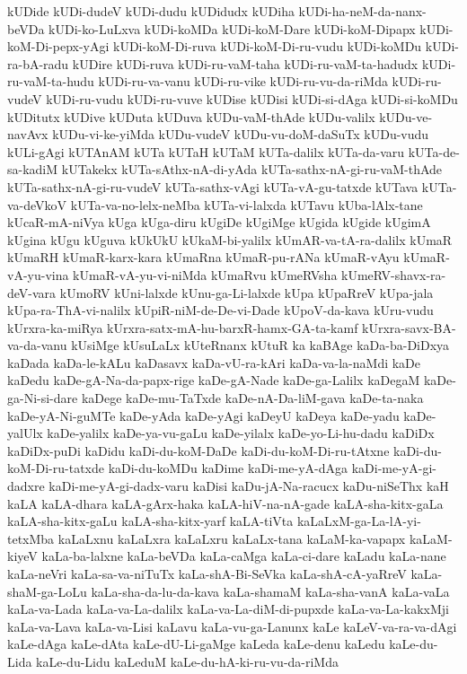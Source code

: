 {kUDide
kUDi-dudeV
kUDi-dudu
kUDidudx
kUDiha
kUDi-ha-neM-da-nanx-beVDa
kUDi-ko-LuLxva
kUDi-koMDa
kUDi-koM-Dare
kUDi-koM-Dipapx
kUDi-koM-Di-pepx-yAgi
kUDi-koM-Di-ruva
kUDi-koM-Di-ru-vudu
kUDi-koMDu
kUDi-ra-bA-radu
kUDire
kUDi-ruva
kUDi-ru-vaM-taha
kUDi-ru-vaM-ta-hadudx
kUDi-ru-vaM-ta-hudu
kUDi-ru-va-vanu
kUDi-ru-vike
kUDi-ru-vu-da-riMda
kUDi-ru-vudeV
kUDi-ru-vudu
kUDi-ru-vuve
kUDise
kUDisi
kUDi-si-dAga
kUDi-si-koMDu
kUDitutx
kUDive
kUDuta
kUDuva
kUDu-vaM-thAde
kUDu-valilx
kUDu-ve-navAvx
kUDu-vi-ke-yiMda
kUDu-vudeV
kUDu-vu-doM-daSuTx
kUDu-vudu
kULi-gAgi
kUTAnAM
kUTa
kUTaH
kUTaM
kUTa-dalilx
kUTa-da-varu
kUTa-de-sa-kadiM
kUTakekx
kUTa-sAthx-nA-di-yAda
kUTa-sathx-nA-gi-ru-vaM-thAde
kUTa-sathx-nA-gi-ru-vudeV
kUTa-sathx-vAgi
kUTa-vA-gu-tatxde
kUTava
kUTa-va-deVkoV
kUTa-va-no-lelx-neMba
kUTa-vi-lalxda
kUTavu
kUba-lAlx-tane
kUcaR-mA-niVya
kUga
kUga-diru
kUgiDe
kUgiMge
kUgida
kUgide
kUgimA
kUgina
kUgu
kUguva
kUkUkU
kUkaM-bi-yalilx
kUmAR-va-tA-ra-dalilx
kUmaR
kUmaRH
kUmaR-karx-kara
kUmaRna
kUmaR-pu-rANa
kUmaR-vAyu
kUmaR-vA-yu-vina
kUmaR-vA-yu-vi-niMda
kUmaRvu
kUmeRVsha
kUmeRV-shavx-ra-deV-vara
kUmoRV
kUni-lalxde
kUnu-ga-Li-lalxde
kUpa
kUpaRreV
kUpa-jala
kUpa-ra-ThA-vi-nalilx
kUpiR-niM-de-De-vi-Dade
kUpoV-da-kava
kUru-vudu
kUrxra-ka-miRya
kUrxra-satx-mA-hu-barxR-hamx-GA-ta-kamf
kUrxra-savx-BA-va-da-vanu
kUsiMge
kUsuLaLx
kUteRnanx
kUtuR
ka
kaBAge
kaDa-ba-DiDxya
kaDada
kaDa-le-kALu
kaDasavx
kaDa-vU-ra-kAri
kaDa-va-la-naMdi
kaDe
kaDedu
kaDe-gA-Na-da-papx-rige
kaDe-gA-Nade
kaDe-ga-Lalilx
kaDegaM
kaDe-ga-Ni-si-dare
kaDege
kaDe-mu-TaTxde
kaDe-nA-Da-liM-gava
kaDe-ta-naka
kaDe-yA-Ni-guMTe
kaDe-yAda
kaDe-yAgi
kaDeyU
kaDeya
kaDe-yadu
kaDe-yalUlx
kaDe-yalilx
kaDe-ya-vu-gaLu
kaDe-yilalx
kaDe-yo-Li-hu-dadu
kaDiDx
kaDiDx-puDi
kaDidu
kaDi-du-koM-DaDe
kaDi-du-koM-Di-ru-tAtxne
kaDi-du-koM-Di-ru-tatxde
kaDi-du-koMDu
kaDime
kaDi-me-yA-dAga
kaDi-me-yA-gi-dadxre
kaDi-me-yA-gi-dadx-varu
kaDisi
kaDu-jA-Na-racucx
kaDu-niSeThx
kaH
kaLA
kaLA-dhara
kaLA-gArx-haka
kaLA-hiV-na-nA-gade
kaLA-sha-kitx-gaLa
kaLA-sha-kitx-gaLu
kaLA-sha-kitx-yarf
kaLA-tiVta
kaLaLxM-ga-La-lA-yi-tetxMba
kaLaLxnu
kaLaLxra
kaLaLxru
kaLaLx-tana
kaLaM-ka-vapapx
kaLaM-kiyeV
kaLa-ba-lalxne
kaLa-beVDa
kaLa-caMga
kaLa-ci-dare
kaLadu
kaLa-nane
kaLa-neVri
kaLa-sa-va-niTuTx
kaLa-shA-Bi-SeVka
kaLa-shA-cA-yaRreV
kaLa-shaM-ga-LoLu
kaLa-sha-da-lu-da-kava
kaLa-shamaM
kaLa-sha-vanA
kaLa-vaLa
kaLa-va-Lada
kaLa-va-La-dalilx
kaLa-va-La-diM-di-pupxde
kaLa-va-La-kakxMji
kaLa-va-Lava
kaLa-va-Lisi
kaLavu
kaLa-vu-ga-Lanunx
kaLe
kaLeV-va-ra-va-dAgi
kaLe-dAga
kaLe-dAta
kaLe-dU-Li-gaMge
kaLeda
kaLe-denu
kaLedu
kaLe-du-Lida
kaLe-du-Lidu
kaLeduM
kaLe-du-hA-ki-ru-vu-da-riMda
}
